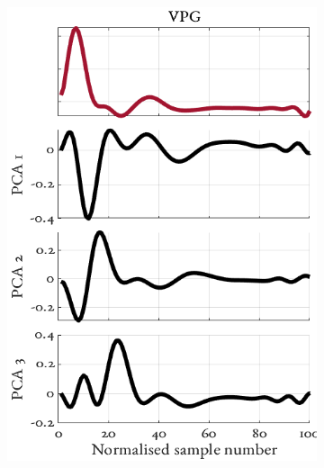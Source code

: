 \documentclass[fleqn,10pt]{wlscirep}
\begin{document}
\begin{figure}[h]
\begin{subfigure}{.3\textwidth}
		\caption{}
	\end{subfigure}
	~
	\begin{subfigure}{.3\textwidth}
		\centering
		\includegraphics[width = \linewidth]{PCA_component_eigenvectors_VPG.png}
		\caption{}
	\end{subfigure}
	\begin{subfigure}{.3\textwidth}
		\centering

\end{subfigure}
\end{figure}
\end{document}

